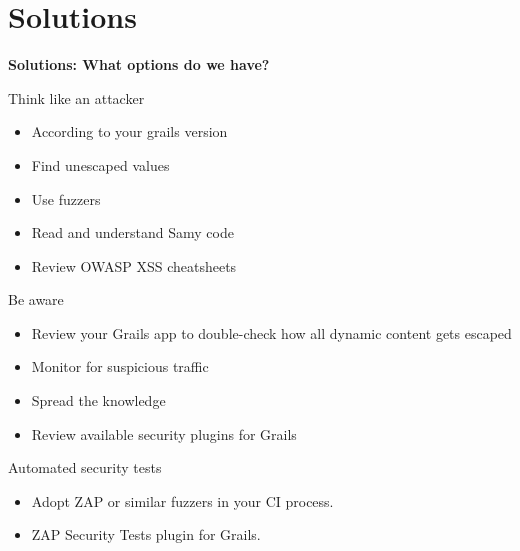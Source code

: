 
\section{Solutions}

\begin{frame}[plain]
    \begin{center}
      \Huge\bfseries
      Solutions: What options do we have?
    \end{center}
\end{frame}

\begin{frame}[plain]{Think like an attacker}
  \begin{itemize}[<+-| alert@+>]
    \item According to your grails version
    \item Find unescaped values
    \item Use fuzzers
    \item Read and understand Samy code
    \item Review OWASP XSS cheatsheets
  \end{itemize}
\end{frame}

\begin{frame}[plain]{Be aware}
  \begin{itemize}[<+-| alert@+>]
    \item Review your Grails app to double-check how all dynamic content gets escaped
    \item Monitor for suspicious traffic
    \item Spread the knowledge
    \item Review available security plugins for Grails
  \end{itemize}
\end{frame}

\begin{frame}[plain]{Automated security tests}
  \begin{itemize}
    \item Adopt ZAP or similar fuzzers in your CI process.
    \item ZAP Security Tests plugin for Grails.
  \end{itemize}

  \begin{center}
  \end{center}
\end{frame}



